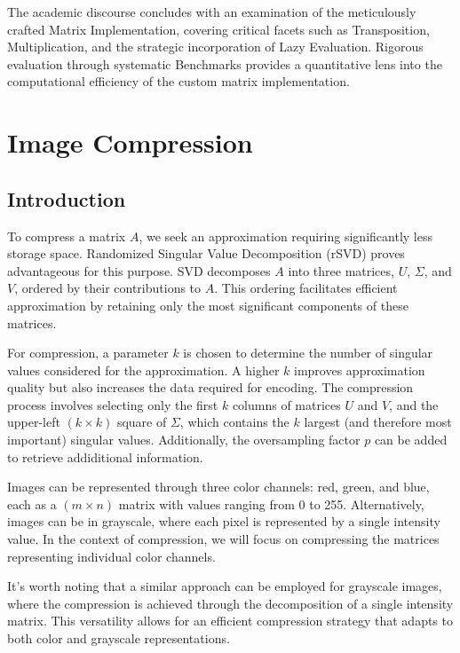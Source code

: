 \documentclass{article}
\begin{document}
The academic discourse concludes with an examination of the meticulously crafted Matrix Implementation, covering critical facets such as Transposition, Multiplication, and the strategic incorporation of Lazy Evaluation. Rigorous evaluation through systematic Benchmarks provides a quantitative lens into the computational efficiency of the custom matrix implementation.



\newpage
\setcounter{section}{0}
\section{Image Compression}
\subsection{Introduction}
To compress a matrix $A$, we seek an approximation requiring significantly less storage space. Randomized Singular Value Decomposition (rSVD) proves advantageous for this purpose. SVD decomposes $A$ into three matrices, $U$, $\Sigma$, and $V$, ordered by their contributions to $A$. This ordering facilitates efficient approximation by retaining only the most significant components of these matrices.

For compression, a parameter $k$ is chosen to determine the number of singular values considered for the approximation. A higher $k$ improves approximation quality but also increases the data required for encoding. The compression process involves selecting only the first $k$ columns of matrices $U$ and $V$, and the upper-left $(k \times k)$ square of $\Sigma$, which contains the $k$ largest (and therefore most important) singular values. Additionally, the oversampling factor $p$ can be added to retrieve addiditional information. 

Images can be represented through three color channels: red, green, and blue, each as a $(m \times n)$ matrix with values ranging from 0 to 255. Alternatively, images can be in grayscale, where each pixel is represented by a single intensity value. In the context of compression, we will focus on compressing the matrices representing individual color channels.

It's worth noting that a similar approach can be employed for grayscale images, where the compression is achieved through the decomposition of a single intensity matrix. This versatility allows for an efficient compression strategy that adapts to both color and grayscale representations.
\end{document}
